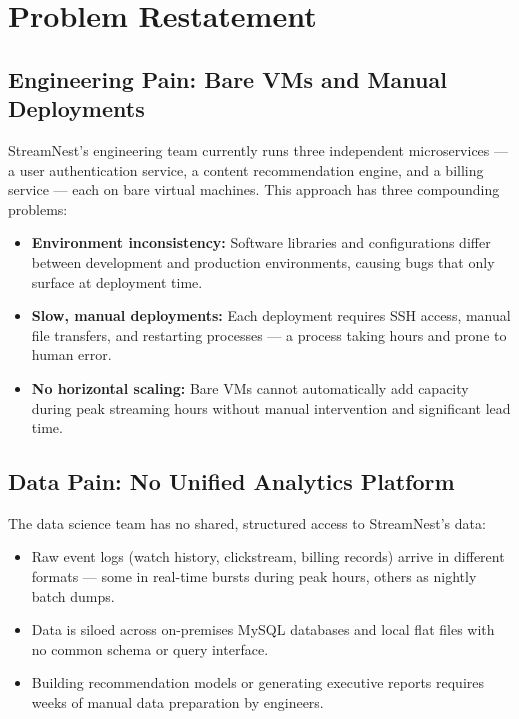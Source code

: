 \documentclass[12pt, a4paper]{article}
\begin{document}
\section{Problem Restatement}

\subsection{Engineering Pain: Bare VMs and Manual Deployments}

StreamNest's engineering team currently runs three independent microservices — a user authentication service, a content recommendation engine, and a billing service — each on bare virtual machines. This approach has three compounding problems:

\begin{itemize}
    \item \textbf{Environment inconsistency:} Software libraries and configurations differ between development and production environments, causing bugs that only surface at deployment time.
    \item \textbf{Slow, manual deployments:} Each deployment requires SSH access, manual file transfers, and restarting processes — a process taking hours and prone to human error.
    \item \textbf{No horizontal scaling:} Bare VMs cannot automatically add capacity during peak streaming hours without manual intervention and significant lead time.
\end{itemize}

\subsection{Data Pain: No Unified Analytics Platform}

The data science team has no shared, structured access to StreamNest's data:

\begin{itemize}
    \item Raw event logs (watch history, clickstream, billing records) arrive in different formats — some in real-time bursts during peak hours, others as nightly batch dumps.
    \item Data is siloed across on-premises MySQL databases and local flat files with no common schema or query interface.
    \item Building recommendation models or generating executive reports requires weeks of manual data preparation by engineers.
\end{itemize}
\end{document}
